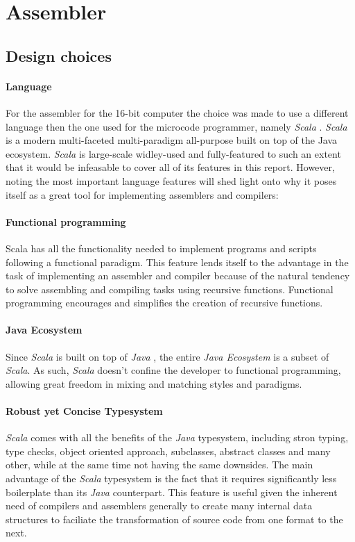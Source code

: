 \section{Assembler}

\subsection{Design choices} \label{asm-des}

\paragraph{Language} For the assembler for the 16-bit computer the choice was made to
use a different language then the one used for the microcode programmer, namely \emph{Scala}
\cite{scala}. \emph{Scala} is a modern multi-faceted multi-paradigm all-purpose built on top
of the Java ecosystem. \emph{Scala} is large-scale widley-used and fully-featured to such an
extent that it would be infeasable to cover all of its features in this report. However, noting
the most important language features will shed light onto why it poses itself as a great tool
for implementing assemblers and compilers:

\paragraph{Functional programming}
Scala has all the functionality needed to implement programs and scripts following a functional
paradigm. This feature lends itself to the advantage in the task of implementing an assembler
and compiler because of the natural tendency to solve assembling and compiling tasks using
recursive functions. Functional programming encourages and simplifies the creation of recursive
functions.

\paragraph{Java Ecosystem}
Since \emph{Scala} is built on top of \emph{Java} \cite{java}, the entire \emph{Java Ecosystem}
is a subset of \emph{Scala}. As such, \emph{Scala} doesn't confine the developer to functional programming, allowing great freedom in mixing and matching styles and paradigms.

\paragraph{Robust yet Concise Typesystem}
\emph{Scala} comes with all the benefits of the \emph{Java} typesystem, including stron typing,
type checks, object oriented approach, subclasses, abstract classes and many other, while at the
same time not having the same downsides. The main advantage of the \emph{Scala} typesystem is the
fact that it requires significantly less boilerplate than its \emph{Java} counterpart. This
feature is useful given the inherent need of compilers and assemblers generally to create many
internal data structures to faciliate the transformation of source code from one format to the
next.



